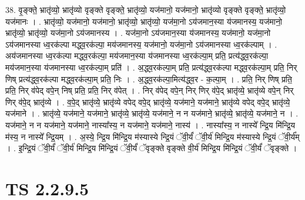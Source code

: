 \documentclass[17pt]{extarticle}
\begin{document}
38. वृ॒ङ्क्ते॒ भ्रातृ॑व्यो॒ भ्रातृ॑व्यो वृङ्क्ते वृङ्क्ते॒ भ्रातृ॑व्यो॒ यज॑मानो॒ यज॑मानो॒ भ्रातृ॑व्यो वृङ्क्ते वृङ्क्ते॒ भ्रातृ॑व्यो॒ यज॑मानः । . भ्रातृ॑व्यो॒ यज॑मानो॒ यज॑मानो॒ भ्रातृ॑व्यो॒ भ्रातृ॑व्यो॒ यज॑मा॒नो ऽय॑जमान॒स्या य॑जमानस्य॒ यज॑मानो॒ भ्रातृ॑व्यो॒ भ्रातृ॑व्यो॒ यज॑मा॒नो ऽय॑जमानस्य । . यज॑मा॒नो ऽय॑जमान॒स्या य॑जमानस्य॒ यज॑मानो॒ यज॑मा॒नो ऽय॑जमानस्या ध्व॒रक॑ल्पा मद्ध्व॒रक॑ल्पा॒ मय॑जमानस्य॒ यज॑मानो॒ यज॑मा॒नो ऽय॑जमानस्या ध्व॒रक॑ल्पाम् । . अय॑जमानस्या ध्व॒रक॑ल्पा मद्ध्व॒रक॑ल्पा॒ मय॑जमान॒स्या य॑जमानस्या ध्व॒रक॑ल्पा॒म् प्रति॒ प्रत्य॑द्ध्व॒रक॑ल्पा॒ मय॑जमान॒स्या य॑जमानस्या ध्व॒रक॑ल्पा॒म् प्रति॑ । . अ॒द्ध्व॒रक॑ल्पा॒म् प्रति॒ प्रत्य॑द्ध्व॒रक॑ल्पा मद्ध्व॒रक॑ल्पा॒म् प्रति॒ निर् णिष् प्रत्य॑द्ध्व॒रक॑ल्पा मद्ध्व॒रक॑ल्पा॒म् प्रति॒ निः । . अ॒द्ध्व॒रक॑ल्पा॒मित्य॑द्ध्व॒र - क॒ल्पा॒म् । . प्रति॒ निर् णिष् प्रति॒ प्रति॒ निर् व॑पेद् वपे॒न् निष् प्रति॒ प्रति॒ निर् व॑पेत् । . निर् व॑पेद् वपे॒न् निर् णिर् व॑पे॒द् भ्रातृ॑व्ये॒ भ्रातृ॑व्ये वपे॒न् निर् णिर् व॑पे॒द् भ्रातृ॑व्ये । . व॒पे॒द् भ्रातृ॑व्ये॒ भ्रातृ॑व्ये वपेद् वपे॒द् भ्रातृ॑व्ये॒ यज॑माने॒ यज॑माने॒ भ्रातृ॑व्ये वपेद् वपे॒द् भ्रातृ॑व्ये॒ यज॑माने । . भ्रातृ॑व्ये॒ यज॑माने॒ यज॑माने॒ भ्रातृ॑व्ये॒ भ्रातृ॑व्ये॒ यज॑माने॒ न न यज॑माने॒ भ्रातृ॑व्ये॒ भ्रातृ॑व्ये॒ यज॑माने॒ न । . यज॑माने॒ न न यज॑माने॒ यज॑माने॒ नास्या᳚स्य॒ न यज॑माने॒ यज॑माने॒ नास्य॑ । . नास्या᳚स्य॒ न नास्ये᳚ न्द्रि॒य मि॑न्द्रि॒य म॑स्य॒ न नास्ये᳚ न्द्रि॒यम् । . अ॒स्ये॒ न्द्रि॒य मि॑न्द्रि॒य म॑स्यास्ये न्द्रि॒यं ॅवी॒र्यं॑ ॅवी॒र्य॑ मिन्द्रि॒य म॑स्यास्ये न्द्रि॒यं ॅवी॒र्य᳚म् । . इ॒न्द्रि॒यं ॅवी॒र्यं॑ ॅवी॒र्य॑ मिन्द्रि॒य मि॑न्द्रि॒यं ॅवी॒र्यं॑ ॅवृङ्क्ते वृङ्क्ते वी॒र्य॑ मिन्द्रि॒य मि॑न्द्रि॒यं ॅवी॒र्यं॑ ॅवृङ्क्ते । \newline
\pagebreak
{}
\section*{ TS 2.2.9.5 }
\end{document}
